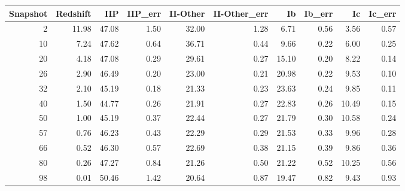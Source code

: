 \begin{tabular}{rrrrrrrrrr}
\toprule
Snapshot & Redshift & IIP & IIP_err & II-Other & II-Other_err & Ib & Ib_err & Ic & Ic_err \\
\midrule
2 & 11.98 & 47.08 & 1.50 & 32.00 & 1.28 & 6.71 & 0.56 & 3.56 & 0.57 \\
10 & 7.24 & 47.62 & 0.64 & 36.71 & 0.44 & 9.66 & 0.22 & 6.00 & 0.25 \\
20 & 4.18 & 47.08 & 0.29 & 29.61 & 0.27 & 15.10 & 0.20 & 8.22 & 0.14 \\
26 & 2.90 & 46.49 & 0.20 & 23.00 & 0.21 & 20.98 & 0.22 & 9.53 & 0.10 \\
32 & 2.10 & 45.19 & 0.18 & 21.33 & 0.23 & 23.63 & 0.24 & 9.85 & 0.11 \\
40 & 1.50 & 44.77 & 0.26 & 21.91 & 0.27 & 22.83 & 0.26 & 10.49 & 0.15 \\
50 & 1.00 & 45.19 & 0.37 & 22.44 & 0.27 & 21.79 & 0.30 & 10.58 & 0.24 \\
57 & 0.76 & 46.23 & 0.43 & 22.29 & 0.29 & 21.53 & 0.33 & 9.96 & 0.28 \\
66 & 0.52 & 46.30 & 0.57 & 22.69 & 0.38 & 21.15 & 0.39 & 9.86 & 0.36 \\
80 & 0.26 & 47.27 & 0.84 & 21.26 & 0.50 & 21.22 & 0.52 & 10.25 & 0.56 \\
98 & 0.01 & 50.46 & 1.42 & 20.64 & 0.87 & 19.47 & 0.82 & 9.43 & 0.93 \\
\bottomrule
\end{tabular}
